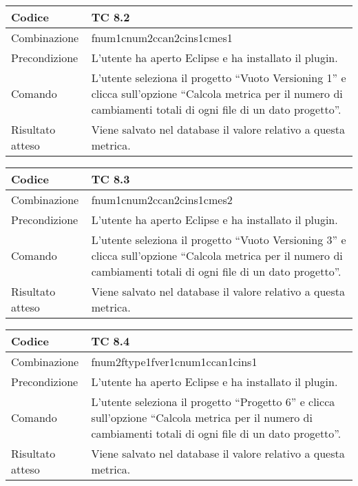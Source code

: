 \begin{table}[ht]
\begin{tabular}{|p{3cm}|p{9cm}|}
\hline
\cellcolor{lightgray}Codice				& TC 8.2								\\
\hline
\cellcolor{lightgray}Combinazione		& fnum1cnum2ccan2cins1cmes1									\\
\hline
\cellcolor{lightgray}Precondizione		& L'utente ha aperto Eclipse e ha installato il plugin.		\\
\hline
\cellcolor{lightgray}Comando			& L'utente seleziona il progetto ``Vuoto Versioning 1''  e clicca sull'opzione ``Calcola metrica per il numero di cambiamenti totali di ogni file di un dato progetto''.	\\
\hline
\cellcolor{lightgray}Risultato atteso	& Viene salvato nel database il valore relativo a questa metrica.\\
\hline
\end{tabular}
\end{table}

\begin{table}[ht]
\begin{tabular}{|p{3cm}|p{9cm}|}
\hline
\cellcolor{lightgray}Codice				& TC 8.3								\\
\hline
\cellcolor{lightgray}Combinazione		& fnum1cnum2ccan2cins1cmes2									\\
\hline
\cellcolor{lightgray}Precondizione		& L'utente ha aperto Eclipse e ha installato il plugin.		\\
\hline
\cellcolor{lightgray}Comando			& L'utente seleziona il progetto ``Vuoto Versioning 3''  e clicca sull'opzione ``Calcola metrica per il numero di cambiamenti totali di ogni file di un dato progetto''.	\\
\hline
\cellcolor{lightgray}Risultato atteso	& Viene salvato nel database il valore relativo a questa metrica.\\
\hline
\end{tabular}
\end{table}

\begin{table}[ht]
\begin{tabular}{|p{3cm}|p{9cm}|}
\hline
\cellcolor{lightgray}Codice				& TC 8.4								\\
\hline
\cellcolor{lightgray}Combinazione		& fnum2ftype1fver1cnum1ccan1cins1									\\
\hline
\cellcolor{lightgray}Precondizione		& L'utente ha aperto Eclipse e ha installato il plugin.		\\
\hline
\cellcolor{lightgray}Comando			& L'utente seleziona il progetto ``Progetto 6''  e clicca sull'opzione ``Calcola metrica per il numero di cambiamenti totali di ogni file di un dato progetto''.	\\
\hline
\cellcolor{lightgray}Risultato atteso	& Viene salvato nel database il valore relativo a questa metrica.\\
\hline
\end{tabular}
\end{table}

